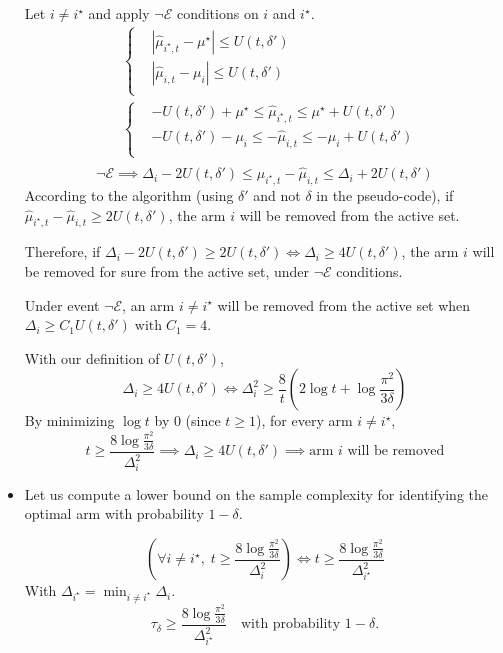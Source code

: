 \documentclass[a4paper]{article}
\newcommand{\wh}[1]{\widehat{#1}}
\begin{document}
\begin{itemize}
	Let $i \neq i^\star$ and apply $\neg \mathcal{E}$ conditions on $i$ and $i^\star$.
	\begin{align*}
		&\begin{cases}
			& | \wh{\mu}_{i^\star,t} - \mu^\star | \leq U(t,\delta')\\
			& | \wh{\mu}_{i,t} - \mu_i | \leq U(t,\delta')\\
		\end{cases}\\
		&\begin{cases}
			& -U(t,\delta') + \mu^\star \leq \wh{\mu}_{i^\star,t} \leq \mu^\star + U(t,\delta')\\
			& -U(t,\delta') - \mu_i \leq -\wh{\mu}_{i,t} \leq -\mu_i + U(t,\delta')\\
		\end{cases}\\
	\end{align*}
	\[
		\neg \mathcal{E} \implies \Delta_i - 2U(t,\delta') \leq \wh{\mu}_{i^\star,t} - \wh{\mu}_{i,t} \leq \Delta_i + 2U(t,\delta')
	\]
	According to the algorithm (using $\delta'$ and not $\delta$ in the pseudo-code), if $\wh{\mu}_{i^\star,t} - \wh{\mu}_{i,t} \geq 2U(t,\delta')$, the arm $i$ will be removed from the active set.
	
	Therefore, if $\Delta_i - 2U(t,\delta') \geq 2U(t,\delta') \iff \Delta_i \geq 4U(t,\delta')$, the arm $i$ will be removed for sure from the active set, under $\neg \mathcal{E}$ conditions.
	
	Under event $\neg \mathcal{E}$, an arm $i \neq i^\star$ will be removed from the active set when $\boxed{\Delta_i \geq C_1 U(t, \delta')\; \text{with}\; C_1=4}$.
	
	With our definition of $U(t, \delta')$,
	\[
		\Delta_i \geq 4 U(t, \delta') \iff \Delta_i^2 \geq \frac{8}{t} \left( 2\log t + \log \frac{\pi^2}{3\delta} \right)
	\]
	By minimizing $\log t$ by $0$ (since $t \geq 1$), for every arm $i \neq i^\star$,
	\[
		\boxed{t \geq \frac{8\log \frac{\pi^2}{3\delta}}{\Delta_i^2}} \implies \Delta_i \geq 4 U(t, \delta') \implies \text{arm $i$ will be removed}
	\]
	
	\item Let us compute a lower bound on the sample complexity for identifying the optimal arm with probability $1-\delta$.
	
	\[
		\left( \forall i \neq i^\star,\; t \geq \frac{8\log \frac{\pi^2}{3\delta}}{\Delta_i^2} \right) \iff t \geq \frac{8\log \frac{\pi^2}{3\delta}}{\Delta_{i^\star}^2}
	\]
	With $\Delta_{i^\star} = \min_{i \neq i^\star} \Delta_i$.
	\[
		\boxed{\tau_\delta \geq \frac{8\log \frac{\pi^2}{3\delta}}{\Delta_{i^\star}^2}} \quad \text{with probability $1-\delta$.}
	\]
	
\end{itemize}
\end{document}
